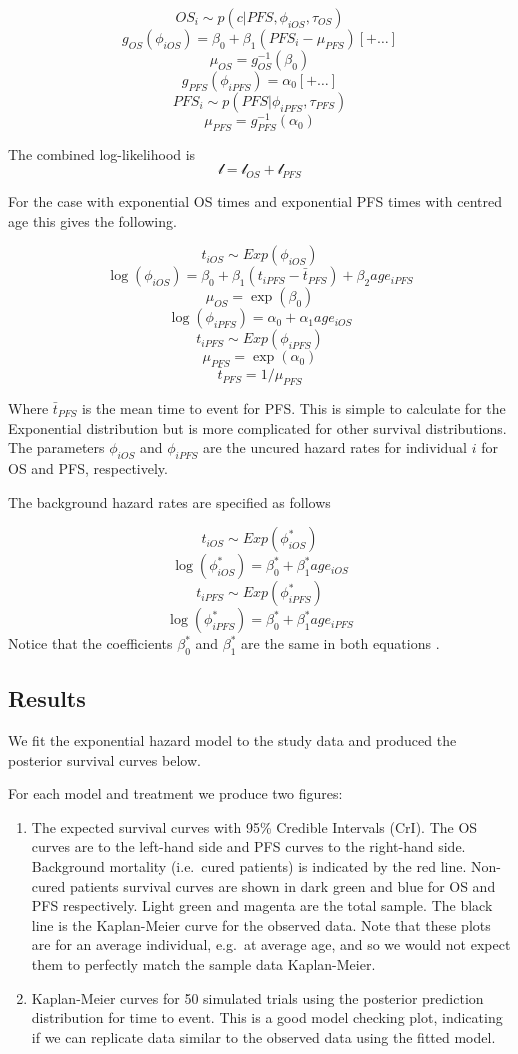 \documentclass[
]{article}
\begin{document}
\[
OS_i \sim p(c | PFS, \phi_{iOS}, \tau_{OS})
\] \[
g_{OS}(\phi_{iOS}) = \beta_0 + \beta_1 (PFS_i - \mu_{PFS})[+ \ldots]
\] \[
\mu_{OS} = g_{OS}^{-1}(\beta_0)
\] \[
g_{PFS}(\phi_{iPFS}) = \alpha_0 [+ \ldots]
\] \[
PFS_i \sim p(PFS | \phi_{iPFS}, \tau_{PFS})
\] \[
\mu_{PFS} = g_{PFS}^{-1}(\alpha_0)
\]

The combined log-likelihood is \[
\mathcal{l} = \mathcal{l}_{OS} + \mathcal{l}_{PFS}
\]

For the case with exponential OS times and exponential PFS times with
centred age this gives the following.

\[
t_{iOS} \sim Exp(\phi_{iOS})
\] \[
\log(\phi_{iOS}) = \beta_0 + \beta_1 (t_{iPFS} - \bar{t}_{PFS}) + \beta_2 age_{iPFS}
\] \[
\mu_{OS} = \exp(\beta_0)
\] \[
\log(\phi_{iPFS}) = \alpha_0 + \alpha_1 age_{iOS}
\] \[
t_{iPFS} \sim Exp(\phi_{iPFS})
\] \[
\mu_{PFS} = \exp(\alpha_0)
\] \[
\bar{t}_{PFS} = 1/\mu_{PFS} 
\]

Where \(\bar{t}_{PFS}\) is the mean time to event for PFS. This is
simple to calculate for the Exponential distribution but is more
complicated for other survival distributions. The parameters
\(\phi_{iOS}\) and \(\phi_{iPFS}\) are the uncured hazard rates for
individual \(i\) for OS and PFS, respectively.

The background hazard rates are specified as follows

\[
t_{iOS} \sim Exp(\phi^*_{iOS})
\] \[
\log(\phi^*_{iOS}) = \beta_0^* + \beta^*_1 age_{iOS}
\] \[
t_{iPFS} \sim Exp(\phi^*_{iPFS})
\] \[
\log(\phi^*_{iPFS}) = \beta_0^* + \beta^*_1 age_{iPFS}
\] Notice that the coefficients \(\beta_0^*\) and \(\beta^*_1\) are the
same in both equations .

\hypertarget{results}{%
\subsection{Results}\label{results}}

We fit the exponential hazard model to the study data and produced the
posterior survival curves below.

For each model and treatment we produce two figures:

\begin{enumerate}
\def\labelenumi{\arabic{enumi}.}
\item
  The expected survival curves with 95\% Credible Intervals (CrI). The
  OS curves are to the left-hand side and PFS curves to the right-hand
  side. Background mortality (i.e.~cured patients) is indicated by the
  red line. Non-cured patients survival curves are shown in dark green
  and blue for OS and PFS respectively. Light green and magenta are the
  total sample. The black line is the Kaplan-Meier curve for the
  observed data. Note that these plots are for an average individual,
  e.g.~at average age, and so we would not expect them to perfectly
  match the sample data Kaplan-Meier.
\item
  Kaplan-Meier curves for 50 simulated trials using the posterior
  prediction distribution for time to event. This is a good model
  checking plot, indicating if we can replicate data similar to the
  observed data using the fitted model.
\end{enumerate}
\end{document}
